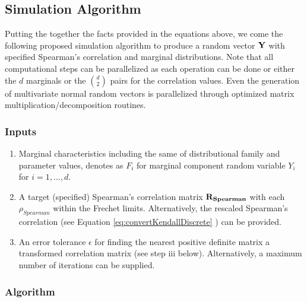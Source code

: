 \documentclass[
]{article}
\providecommand{\tightlist}{%
  \setlength{\itemsep}{0pt}\setlength{\parskip}{0pt}}
\begin{document}
\hypertarget{simulation-algorithm-1}{%
\subsection{Simulation Algorithm}\label{simulation-algorithm-1}}

Putting the together the facts provided in the equations above, we come the following proposed simulation algorithm to produce a random vector \({\bf Y}\) with specified Spearman's correlation and marginal distributions. Note that all computational steps can be parallelized as each operation can be done or either the \(d\) marginals or the \(\binom{d}{2}\) pairs for the correlation values. Even the generation of multivariate normal random vectors is parallelized through optimized matrix multiplication/decomposition routines.

\hypertarget{inputs}{%
\subsubsection{Inputs}\label{inputs}}

\begin{enumerate}
\def\labelenumi{(\arabic{enumi})}
\tightlist
\item
  Marginal characteristics including the same of distributional family and parameter values, denotes as \(F_i\) for marginal component random variable \(Y_i\) for \(i=1,\ldots,d\).
\item
  A target (specified) Spearman's correlation matrix \({\bf R_{Spearman}}\) with
  each \(\rho_{Spearman}\) within the Frechet limits. Alternatively, the rescaled
  Spearman's correlation (see Equation \eqref{eq:convertKendallDiscrete} ) can be provided.
\item
  An error tolerance \(\epsilon\) for finding the nearest positive definite matrix a transformed correlation matrix (see step iii below). Alternatively, a maximum number of iterations can be supplied.
\end{enumerate}

\hypertarget{algorithm}{%
\subsubsection{Algorithm}\label{algorithm}}
\end{document}

